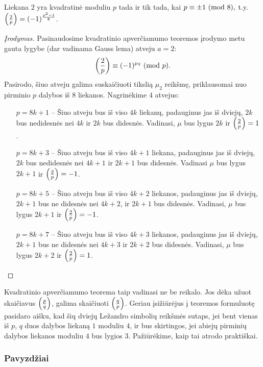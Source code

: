 \begin{thm} Liekana $2$ yra kvadratinė moduliu $p$ tada ir tik tada, kai
  $p\equiv \pm1 \ (\text{mod } 8),$ t.y. $\left(\frac{2}{p}\right) = (-1)^\frac{p^2 -1}{8}$.
\end{thm}

\begin{proof}[Įrodymas]
  Pasinaudosime kvadratinio apverčiamumo teoremos įrodymo metu gauta lygybe
  (dar vadinama Gauss lema) atveju $a=2$:
  $$\left(\frac{2}{p}\right) \equiv (-1)^{\mu_2} \ (\text{mod } p).$$
  Pasirodo, šiuo atveju galima suskaičiuoti tikslią $\mu_2$ reikšmę,
  priklausomai nuo pirminio $p$ dalybos iš $8$ liekanos. Nagrinėkime $4$
  atvejus:

  \begin{itemize}
    \item[$p = 8k + 1$ -- ] Šiuo atveju bus iš viso $4k$ liekanų, padauginus
      jas iš dviejų, $2k$ bus nedidesnės nei $4k$ ir $2k$ bus didesnės.
      Vadinasi, $\mu$ bus lygus $2k$ ir $\left(\frac{2}{p}\right) = 1$.
    \item[$p = 8k + 3$ -- ] Šiuo atveju bus iš viso $4k + 1$ liekana,
      padauginus jas iš dviejų, $2k$ bus nedidesnės nei $4k+1$ ir $2k+1$ bus
      didesnės. Vadinasi $\mu$ bus lygus $2k+1$ ir $\left(\frac{2}{p}\right) = -1$.
    \item[$p = 8k + 5$ -- ] Šiuo atveju bus iš viso $4k + 2$ liekanos,
      padauginus jas iš dviejų, $2k+1$ bus ne didesnės nei $4k+2$, ir $2k+1$
      bus didesnės. Vadinasi, $\mu$ bus lygus $2k+1$ ir $\left(\frac{2}{p}\right) = -1$.
    \item[$p = 8k + 7$ -- ] Šiuo atveju bus iš viso $4k + 3$ liekanos,
      padauginus jas iš dviejų, $2k+1$ bus ne didesnės nei $4k+3$ ir $2k+2$
      bus didesnės. Vadinasi, $\mu$ bus lygus $2k+2$ ir $\left(\frac{2}{p}\right) = 1$.  
  \end{itemize}
\end{proof}

Kvadratinio apverčiamumo teorema taip vadinasi ne be reikalo. Jos dėka
užuot skaičiavus $\left(\frac{p}{q}\right)$, galima skaičiuoti $\left(\frac{q}{p}\right)$. Geriau
įsižiūrėjus į teoremos formuluotę pasidaro aišku, kad šių dviejų Ležandro
simbolių reikšmės sutaps, jei bent vienas iš $p$, $q$ duos dalybos liekaną
$1$ moduliu $4$, ir bus skirtingos, jei abiejų pirminių dalybos liekanos
moduliu $4$ bus lygios $3$. Pažiūrėkime, kaip tai atrodo praktiškai.

\subsubsection{Pavyzdžiai}

